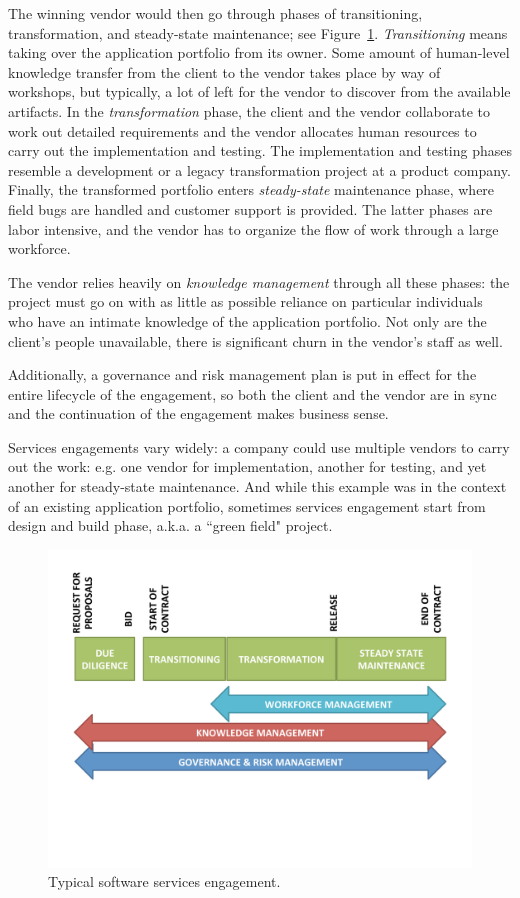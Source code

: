 The winning vendor would then go through phases of transitioning, transformation, and steady-state maintenance; see Figure~\ref{fig:phases}. \textit{Transitioning} means taking over the application portfolio from its owner. Some amount of human-level knowledge transfer from the client to the vendor takes place by way of workshops, but typically, a lot of left for the vendor to discover from the available artifacts. In the \textit{transformation} phase, the client and the vendor collaborate to work out detailed requirements and the vendor allocates human resources to carry out the implementation and testing. The implementation and testing phases resemble a development or a legacy transformation project at a product company.  Finally, the transformed portfolio enters \textit{steady-state} maintenance phase, where field bugs are handled and customer support is provided.  The latter phases are labor intensive, and the vendor has to organize the flow of work through a large workforce.

The vendor relies heavily on \textit{knowledge management} through all these phases: the project must go on with as little as possible reliance on particular individuals who have an intimate knowledge of the application portfolio. Not only are the client's people unavailable, there is significant churn in the vendor's staff as well.

Additionally, a governance and risk management plan is put in effect for the entire lifecycle of the engagement, so both the client and the vendor are in sync and the continuation of the engagement makes business sense.

Services engagements vary widely: a company could use multiple vendors to carry out the work: e.g. one vendor for implementation, another for testing, and yet another for steady-state maintenance.  And while this example was in the context of an existing application portfolio, sometimes services engagement start from design and build phase, a.k.a. a ``green field" project.


%
%
%

\begin{figure}[t]
\centering
\includegraphics[width=0.8\columnwidth, clip, trim = 0mm 50mm 0mm
  10mm]{figs/phases.pdf}
\vspace*{-15pt}
\caption{Typical software services engagement.}
\vspace*{-10pt}
\label{fig:phases}
\end{figure}


